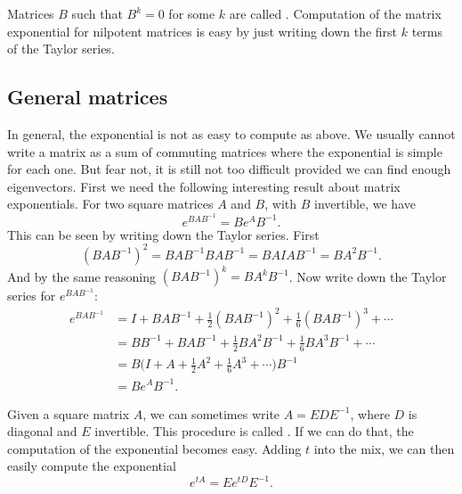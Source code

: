 \documentclass[12pt]{book}
\begin{document}
Matrices $B$ such that $B^k = 0$ for some $k$ are called
\emph{}.  Computation of the matrix exponential for
nilpotent matrices is easy by just writing down the first $k$ terms of
the Taylor series.

\subsection{General matrices}

In general, the exponential is not as easy to compute as above.  We usually
cannot write a matrix as a sum of commuting matrices where the exponential
is simple for each one.  But fear not, it is still not too difficult provided
we can find enough eigenvectors.  First we need the following interesting
result about matrix exponentials.  For two square matrices $A$ and $B$, with
$B$ invertible,
we have
\begin{equation*}
e^{BAB^{-1}} = B e^A B^{-1} .
\end{equation*}
This can be seen by writing down the Taylor series.  First 
\begin{equation*}
{(BAB^{-1})}^2 =
BAB^{-1} BAB^{-1} =
BAIAB^{-1} =
BA^2B^{-1} .
\end{equation*}
And by the same reasoning ${(BAB^{-1})}^k = B A^k B^{-1}$.  Now write 
down the Taylor series for
$e^{BAB^{-1}}$:
\begin{equation*}
\begin{split}
e^{BAB^{-1}} & =
I + {BAB^{-1}} + \frac{1}{2} {(BAB^{-1})}^2 + 
\frac{1}{6} {(BAB^{-1})}^3 + \cdots
\\
& =
BB^{-1} + {BAB^{-1}} + \frac{1}{2} BA^2B^{-1} + 
\frac{1}{6} BA^3B^{-1} + \cdots
\\
& =
B \bigl(
I + A + \frac{1}{2} A^2 + 
\frac{1}{6} A^3 + \cdots \bigr) B^{-1} \\
& = B e^A B^{-1} .
\end{split}
\end{equation*}

Given a square matrix $A$, 
we can sometimes write $A = E D E^{-1}$, where $D$ is
diagonal and $E$ invertible.
This procedure is called \emph{}.
If we can do
that, the computation  of the
exponential becomes easy.  Adding $t$ into the mix, 
we can then easily compute the exponential
\begin{equation*}
e^{tA} = E e^{tD} E^{-1} .
\end{equation*}
\end{document}
